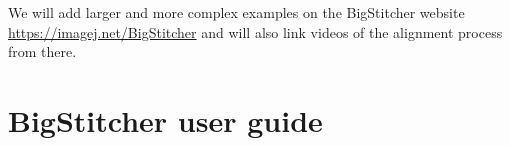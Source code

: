 \documentclass[]{spie}  %
\begin{document}
\begin{description}
\end{description}

We will add larger and more complex examples on the BigStitcher website \url{https://imagej.net/BigStitcher} and will also link videos of the  alignment process from there.




\section{BigStitcher user guide}
\label{sec:documentation}

\end{document}

